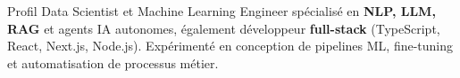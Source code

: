 
\begin{rubric}{Profil}
\entry*[]
Data Scientist et Machine Learning Engineer spécialisé en \textbf{NLP, LLM, RAG} et agents IA autonomes, également développeur \textbf{full-stack} (TypeScript, React, Next.js, Node.js). Expérimenté en conception de pipelines ML, fine-tuning et automatisation de processus métier.
\end{rubric}
